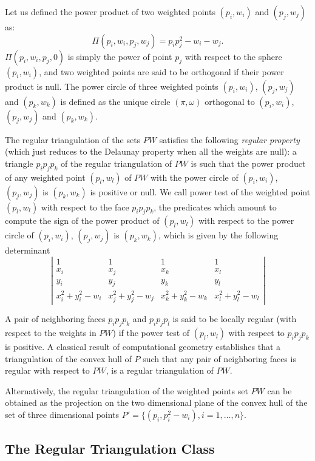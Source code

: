 Let us defined the power product of two weighted points
$(p_i, w_i)$ and $(p_j, w_j)$ as:
\[\Pi(p_i, w_i,p_j, w_j) = p_ip_j ^2 - w_i  - w_j  .\]
$\Pi(p_i, w_i,p_j, 0)$ is simply the power of point $p_j$
with respect to the sphere $(p_i, w_i)$, and two weighted points 
are said to be orthogonal if their power product is null.
The power circle of three weighted points
 $(p_i, w_i)$, $(p_j, w_j)$
and $(p_k, w_k)$ is defined as the unique circle
$(\pi, \omega)$  orthogonal to
 $(p_i, w_i)$, $(p_j, w_j)$
and $(p_k, w_k)$.

The regular triangulation of the sets ${  PW}$
satisfies the following {\em regular property} (which just reduces to the 
Delaunay property when all the weights are null):
a triangle $p_ip_jp_k$ of the regular triangulation
of ${  PW}$ is such that the power product of any weighted point
 $(p_l, w_l)$ of ${  PW}$ with the power circle of
 $(p_i, w_i)$, $(p_j, w_j)$ is $(p_k, w_k)$ is positive or null.
We call  power test of the weighted point $(p_l, w_l)$ with respect
to the face  $p_ip_jp_k$, the predicates which amount to compute
the sign of 
the power product of $(p_l, w_l)$ with respect to
the power circle of
 $(p_i, w_i)$, $(p_j, w_j)$ is $(p_k, w_k)$,
which is given by the following
determinant
\[\left| \begin{array}{cccc}
1    & 1                       & 1                       & 1 \\
x_i & x_j & x_k & x_l \\
y_i & y_j & y_k & y_l \\
x_i ^2 + y_i ^2 -w_i & x_j ^2 + y_j ^2 - w_j & x_k ^2 + y_k ^2 - w_k &
x_l ^2 + y_l ^2 -w_l  
\end{array}
\right|
\]

A pair of neighboring faces $p_ip_jp_k$
and $p_ip_jp_l$ is said to be locally regular
(with respect to  the weights in ${  PW}$)
if the power test of $(p_l,w_l)$ with respect to
$p_ip_jp_k$ is positive.
A classical  result of computational geometry
establishes that a triangulation of the convex hull of ${  P}$
such that any pair of neighboring faces is regular with respect
to ${  PW}$, is a
 regular triangulation of ${  PW}$.

Alternatively, the regular triangulation
of the weighted points set ${  PW}$
can be obtained as the projection
on the two dimensional plane of the convex hull of the set of three
dimensional points 
${  P'}= \{ (p_i,p_i ^2 - w_i ), i = 1, \ldots , n \}$.

\subsection{ The Regular Triangulation  Class}


